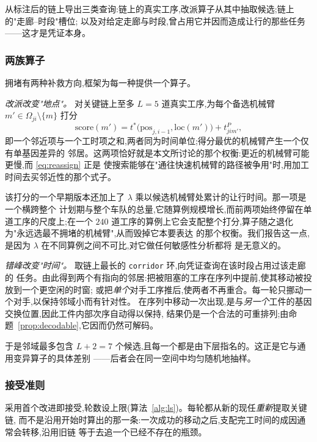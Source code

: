 \documentclass[manuscript,screen,review]{acmart}
\begin{document}
从标注后的链上导出三类查询:链上的真实工序,改派算子从其中抽取候选;链上的"走廊--时段"槽位;
以及对给定走廊与时段,曾占用它并因而造成让行的那些任务——这才是凭证本身。

\subsubsection{两族算子}
拥堵有两种补救方向,框架为每一种提供一个算子。

\emph{改派改变"地点"。} 对关键链上至多 $L=5$ 道真实工序,为每个备选机械臂
$m'\in\Omega_{ji}\setminus\{m\}$ 打分
\begin{equation}
\label{eq:reassign}
\mathrm{score}(m')=t^{*}\bigl(\mathrm{pos}_{j,i-1},\mathrm{loc}(m')\bigr)
+t^{P}_{jim'},
\end{equation}
即一个邻近项与一个工时项之和,两者同为时间单位;得分最优的机械臂产生一个仅有单基因差异的
邻居。这两项恰好就是本文所讨论的那个权衡:更近的机械臂可能更慢,而 \eqref{eq:reassign} 正是
使搜索能够在"通往快速机械臂的路径被争用"时,用加工时间去买邻近性的那个式子。

该打分的一个早期版本还加上了 $\lambda$ 乘以候选机械臂处累计的让行时间。那一项是一个横跨整个
计划期与整个车队的总量,它随算例规模增长,而前两项始终停留在单道工序的尺度上;在一个 $240$
道工序的算例上它会支配整个打分,算子随之退化为"永远选最不拥堵的机械臂",从而毁掉它本要表达
的那个权衡。我们报告这一点,是因为 $\lambda$ 在不同算例之间不可比,对它做任何敏感性分析都将
是无意义的。

\emph{错峰改变"时间"。} 取链上最长的 \texttt{corridor} 环,向凭证查询在该时段占用过该走廊的
任务。由此得到两个有指向的邻居:把被阻塞的工序在序列中提前,使其移动被投放到一个更空闲的时窗;
或把\emph{单个}对手工序推后,使两者不再重合。每一轮只挪动一个对手,以保持邻域小而有针对性。
在序列中移动一次出现,是与\emph{另一个}工件的基因交换位置,因此工件内部次序自动得以保持,
结果仍是一个合法的可重排列;由命题~\ref{prop:decodable},它因而仍然可解码。

于是邻域最多包含 $L+2=7$ 个候选,且每一个都是由下层指名的。这正是它与通用变异算子的具体差别
——后者会在同一空间中均匀随机地抽样。

\subsubsection{接受准则}
采用首个改进即接受,轮数设上限(算法~\ref{alg:ls})。每轮都从新的现任\emph{重新}提取关键链,
而不是沿用开始时算出的那一条:一次成功的移动之后,支配完工时间的成因通常会转移,沿用旧链
等于去追一个已经不存在的瓶颈。
\end{document}
